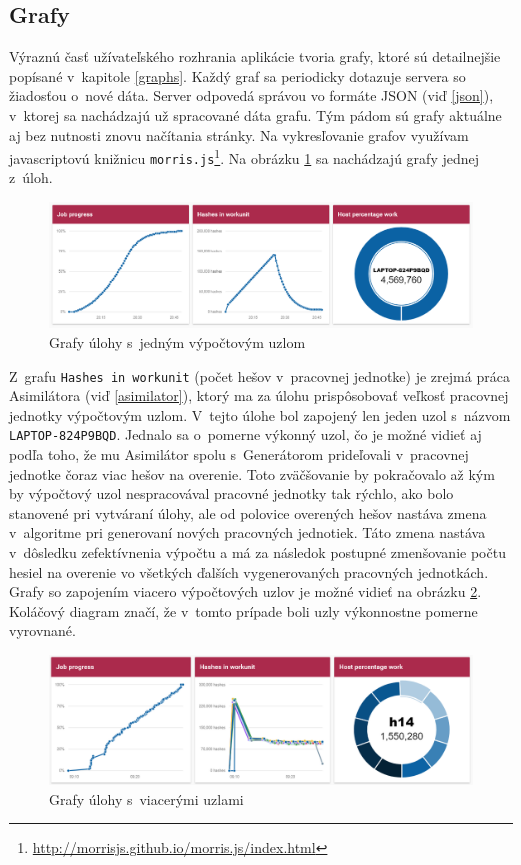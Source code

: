 \documentclass[slovak]{fitthesis}
\begin{document}
\subsection{Grafy}
Výraznú časť užívateľského rozhrania aplikácie tvoria grafy, ktoré sú detailnejšie popísané v~kapitole \ref{graphs}. Každý graf sa periodicky dotazuje servera so žiadosťou o~nové dáta. Server odpovedá správou vo formáte JSON (viď \ref{json}), v~ktorej sa nachádzajú už spracované dáta grafu. Tým pádom sú grafy aktuálne aj bez nutnosti znovu načítania stránky. Na vykresľovanie grafov využívam javascriptovú knižnicu \texttt{morris.js}\footnote{\url{http://morrisjs.github.io/morris.js/index.html}}. Na obrázku \ref{fig:graf1} sa nachádzajú grafy jednej z~úloh.
\begin{figure}[h]
    \centering
    \includegraphics[scale=0.53]{obrazky/graf1.PNG}
    \caption{Grafy úlohy s~jedným výpočtovým uzlom}
    \label{fig:graf1}
\end{figure} 
Z~grafu \texttt{Hashes in workunit} (počet hešov v~pracovnej jednotke) je zrejmá práca Asimilátora (viď \ref{asimilator}), ktorý ma za úlohu prispôsobovať veľkosť pracovnej jednotky výpočtovým uzlom. V~tejto úlohe bol zapojený len jeden uzol s~názvom \texttt{LAPTOP-824P9BQD}. Jednalo sa o~pomerne výkonný uzol, čo je možné vidieť aj podľa toho, že mu Asimilátor spolu s~Generátorom prideľovali v~pracovnej jednotke čoraz viac hešov na overenie. Toto zväčšovanie by pokračovalo až kým by výpočtový uzol nespracovával pracovné jednotky tak rýchlo, ako bolo stanovené pri vytváraní úlohy, ale od polovice overených hešov nastáva zmena v~algoritme pri generovaní nových pracovných jednotiek. Táto zmena nastáva v~dôsledku zefektívnenia výpočtu a má za následok postupné zmenšovanie počtu hesiel na overenie vo všetkých ďalších vygenerovaných pracovných jednotkách.  Grafy so zapojením viacero výpočtových uzlov je možné vidieť na obrázku \ref{fig:graf2}. Koláčový diagram značí, že v~tomto prípade boli uzly výkonnostne pomerne vyrovnané. 
\begin{figure}[H]
    \centering
    \includegraphics[scale=0.56]{obrazky/graf2.PNG}
    \caption{Grafy úlohy s~viacerými uzlami}
    \label{fig:graf2}
\end{figure}
\end{document}
